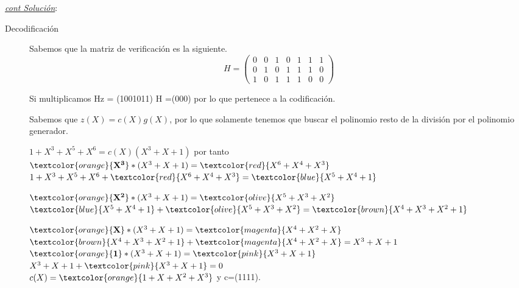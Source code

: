 \documentclass{beamer}
\theoremstyle{plain}
\theoremstyle{example}
\theoremstyle{example}
\begin{document}
\begin{frame}  \footnotesize 

 \textit{\underline{cont Solución}}:\\ 

\begin{description}

\item [Decodificación]

Sabemos que la matriz de verificación es la siguiente.
\[
    H =   \left( \begin{array}{ccccccc}
     				  0 &  0  & 1  & 0 & 1  & 1  & 1\\ 
					  0 &  1  & 0	&  1 & 1 &	 1  & 0\\ 
					  1 &  0  & 1  &  1 & 1 & 0  & 0
           			\end{array}
    		\right) 	    		
\]

Si multiplicamos Hz = (1001011) H =(000) por lo que pertenece a la codificación.

Sabemos que $z(X) = c(X) g(X)$, por lo que solamente tenemos que buscar el polinomio resto de la división por el polinomio generador. 

$1+X^3+X^5+X^6 = c(X) (X^3+X+1)$ por tanto \\
\vspace{0.3cm}
\tiny
$\textcolor{orange}{\mathbf{X^3}} * (X^3+X+1) = \textcolor{red}{X^6 +X^4 + X^3} $\\
\hspace{0.3cm}$ 1+X^3+X^5+X^6 +\textcolor{red}{X^6 +X^4 + X^3} = \textcolor{blue}{X^5 + X^4 +1}$

$\textcolor{orange}{\mathbf{X^2}} * (X^3+X+1) = \textcolor{olive}{X^5+X^3+X^2} $\\
\hspace{0.3cm}$\textcolor{blue}{X^5 + X^4 +1} + \textcolor{olive}{X^5+X^3+X^2} = \textcolor{brown}{X^4 + X^3+X^2 +1}   $

$\textcolor{orange}{\mathbf{X}} * (X^3+X+1) =\textcolor{magenta}{ X^4+X^2+X }$\\
\hspace{0.3cm}$\textcolor{brown}{X^4 + X^3+X^2 +1} +\textcolor{magenta}{ X^4+X^2+X } =   X^3 + X + 1$\\
 
$\textcolor{orange}{\mathbf{1}} * (X^3+X+1) = \textcolor{pink}{X^3 + X + 1}$\\
\hspace{0.3cm} $ X^3 + X + 1 + \textcolor{pink}{X^3 + X + 1}= 0$\\
\vspace{0.3cm}
\footnotesize
$c(X) = \textcolor{orange}{1+X+ X^2+X^3}$ y c=(1111).


\end{description}

\end{frame}
\end{document}
